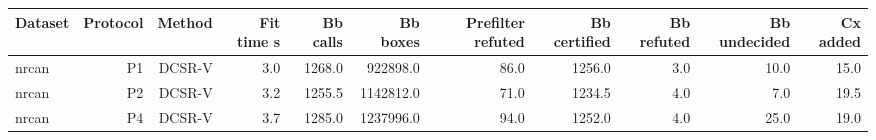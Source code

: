 \begin{tabular}{lrrrrrrrrrr}
\toprule
Dataset & Protocol & Method & Fit time s & Bb calls & Bb boxes & Prefilter refuted & Bb certified & Bb refuted & Bb undecided & Cx added \\
\midrule
nrcan & P1 & DCSR-V & 3.0 & 1268.0 & 922898.0 & 86.0 & 1256.0 & 3.0 & 10.0 & 15.0 \\
nrcan & P2 & DCSR-V & 3.2 & 1255.5 & 1142812.0 & 71.0 & 1234.5 & 4.0 & 7.0 & 19.5 \\
nrcan & P4 & DCSR-V & 3.7 & 1285.0 & 1237996.0 & 94.0 & 1252.0 & 4.0 & 25.0 & 19.0 \\
\bottomrule
\end{tabular}
